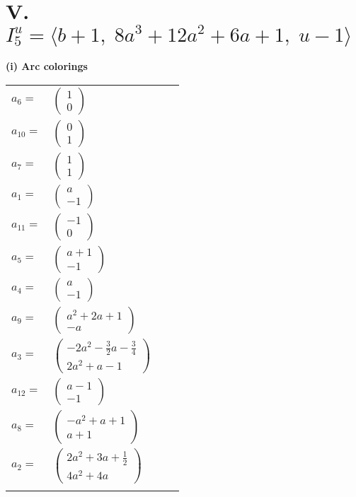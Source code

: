 \documentclass[1p]{elsarticle_modified}
\theoremstyle{definition}
\begin{document}
\centering \section*{V. $I^u_{5}= \langle b+1,\;8 a^3+12 a^2+6 a+1,\;u-1 \rangle$}
\flushleft \textbf{(i) Arc colorings}\\
\begin{tabular}{m{7pt} m{180pt} m{7pt} m{180pt} }
\flushright $a_{6}=$&$\begin{pmatrix}1\\0\end{pmatrix}$ \\
\flushright $a_{10}=$&$\begin{pmatrix}0\\1\end{pmatrix}$ \\
\flushright $a_{7}=$&$\begin{pmatrix}1\\1\end{pmatrix}$ \\
\flushright $a_{1}=$&$\begin{pmatrix}a\\-1\end{pmatrix}$ \\
\flushright $a_{11}=$&$\begin{pmatrix}-1\\0\end{pmatrix}$ \\
\flushright $a_{5}=$&$\begin{pmatrix}a+1\\-1\end{pmatrix}$ \\
\flushright $a_{4}=$&$\begin{pmatrix}a\\-1\end{pmatrix}$ \\
\flushright $a_{9}=$&$\begin{pmatrix}a^2+2 a+1\\- a\end{pmatrix}$ \\
\flushright $a_{3}=$&$\begin{pmatrix}-2 a^2-\frac{3}{2} a-\frac{3}{4}\\2 a^2+a-1\end{pmatrix}$ \\
\flushright $a_{12}=$&$\begin{pmatrix}a-1\\-1\end{pmatrix}$ \\
\flushright $a_{8}=$&$\begin{pmatrix}- a^2+a+1\\a+1\end{pmatrix}$ \\
\flushright $a_{2}=$&$\begin{pmatrix}2 a^2+3 a+\frac{1}{2}\\4 a^2+4 a\end{pmatrix}$\\&\end{tabular}
\end{document}
